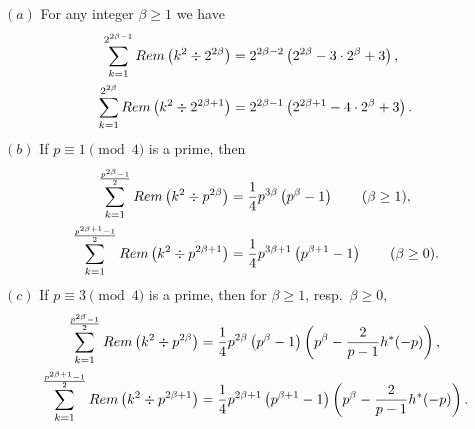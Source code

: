\documentclass[10pt,a4paper]{amsart}
\begin{document}
\begin{lemma}\label{lem:6.2}
$(a)$ For any integer $\beta\geq 1$ we have
\begin{align}
\sum_{k=1}^{2^{2\beta-1}}{\rm Rem}\left(k^2\div 2^{2\beta}\right)
&= 2^{2\beta-2}\left(2^{2\beta}-3\cdot 2^{\beta}+3\right),\label{6.6}\\
\sum_{k=1}^{2^{2\beta}}{\rm Rem}\left(k^2\div 2^{2\beta+1}\right)
&= 2^{2\beta-1}\left(2^{2\beta+1}-4\cdot 2^{\beta}+3\right).\label{6.7}
\end{align}
$(b)$ If $p\equiv 1\pmod{4}$ is a prime, then
\begin{align}
\sum_{k=1}^{\frac{p^{2\beta}-1}{2}}{\rm Rem}\left(k^2\div p^{2\beta}\right)
&=\frac{1}{4}p^{3\beta}\left(p^{\beta}-1\right)\qquad(\beta\geq 1),\label{6.8}\\
\sum_{k=1}^{\frac{p^{2\beta+1}-1}{2}}{\rm Rem}\left(k^2\div p^{2\beta+1}\right)
&=\frac{1}{4}p^{3\beta+1}\left(p^{\beta+1}-1\right)\qquad(\beta\geq 0).\label{6.9}
\end{align}
$(c)$ If $p\equiv 3\pmod{4}$ is a prime, then for $\beta\geq 1$, resp.\
$\beta\geq 0$,
\begin{align}
\sum_{k=1}^{\frac{p^{2\beta}-1}{2}}{\rm Rem}\left(k^2\div p^{2\beta}\right)
&=\frac{1}{4}p^{2\beta}\left(p^{\beta}-1\right)
\left(p^{\beta}-\frac{2}{p-1}h^*(-p)\right),\label{6.10}\\
\sum_{k=1}^{\frac{p^{2\beta+1}-1}{2}}{\rm Rem}\left(k^2\div p^{2\beta+1}\right)
&=\frac{1}{4}p^{2\beta+1}\left(p^{\beta+1}-1\right)
\left(p^{\beta}-\frac{2}{p-1}h^*(-p)\right).\label{6.11}
\end{align}
\end{lemma}
\end{document}
